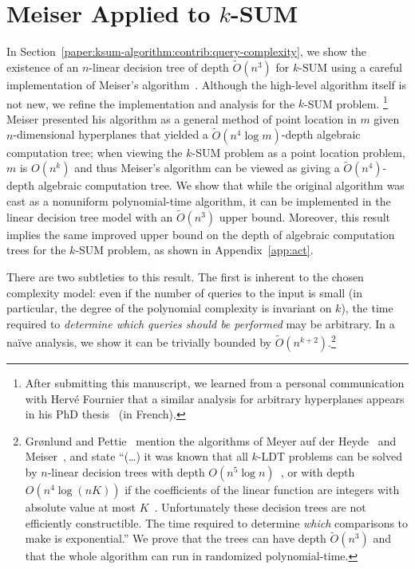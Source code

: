\section{Meiser Applied to \(k\)-SUM}

In Section~\ref{paper:ksum-algorithm:contrib:query-complexity}, we show the existence of an $n$-linear
decision tree of depth $\tilde{O}(n^3)$ for \(k\)-SUM using a careful
implementation of Meiser's algorithm~\cite{M93}.
Although the high-level algorithm itself is not new, we refine the
implementation and analysis for the \(k\)-SUM problem.%
\footnote{After submitting this manuscript, we learned from a personal communication
with Herv\'e Fournier that a similar analysis for arbitrary hyperplanes appears in his PhD
thesis~\cite{F01} (in French).}
Meiser presented his algorithm as a general method of point location in $m$
given $n$-dimensional hyperplanes that yielded a $\tilde{O}(n^4 \log
m)$-depth algebraic computation tree; when viewing the \(k\)-SUM problem as a point
location problem, $m$ is $O(n^k)$ and thus Meiser's algorithm can be viewed
as giving a $\tilde{O}(n^4)$-depth algebraic computation tree.
We show that while the
original algorithm was cast as a nonuniform polynomial-time algorithm,
it can be implemented in the linear decision tree model with an
$\tilde{O}(n^3)$ upper bound.
Moreover, this result implies the same improved upper bound on the depth of
algebraic computation trees for the $k$-SUM problem,
as shown in Appendix~\ref{app:act}.

There are two subtleties to this result. The first is inherent to the chosen
complexity model: even if the number of queries to the input is small (in
particular, the degree of the polynomial complexity is invariant on $k$), the
time required to \emph{determine which queries should be performed} may be
arbitrary. In a na\"ive analysis, we show it can be trivially bounded by
$\tilde{O}(n^{k+2})$.\footnote{%
	Gr{\o}nlund and
	Pettie~\cite{GP18} mention the algorithms of Meyer auf der Heyde~\cite{M84} and
	Meiser~\cite{M93}, and state ``(\ldots) it was known that all \(k\)-LDT problems
	can be solved by $n$-linear decision trees with depth $O(n^5\log
	n)$~\cite{M93}, or with depth $O(n^4\log (nK))$ if the coefficients of the
	linear function are integers with absolute value at most $K$~\cite{M84}.
	Unfortunately these decision trees are not efficiently constructible. The
	time required to determine \emph{which} comparisons to make is
	exponential.'' We prove that the trees can have depth $\tilde{O}(n^3)$ and
	that the whole algorithm can run in randomized polynomial-time.}


